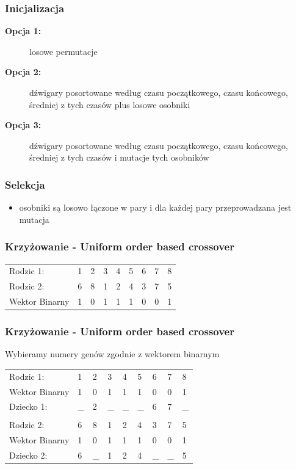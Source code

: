 \documentclass{beamer}
\begin{document}
\begin{frame}
 \frametitle{Inicjalizacja}
 \begin{description}
  \item[\textbf{Opcja 1:}] losowe permutacje
  \item[\textbf{Opcja 2:}] dźwigary posortowane według czasu początkowego, czasu końcowego, średniej z tych czasów plus losowe osobniki
  \item[\textbf{Opcja 3:}]  dźwigary posortowane według czasu początkowego, czasu końcowego, średniej z tych czasów i mutacje tych osobników
  \end{description}
\end{frame}

\begin{frame}
 \frametitle{Selekcja}
 \begin{itemize}
  \item osobniki są losowo łączone w pary i dla każdej pary przeprowadzana jest mutacja
 \end{itemize}

\end{frame}

\begin{frame}
 \frametitle{Krzyżowanie - Uniform order based crossover}
\begin{center}
\begin{tabular}{lllllllll}
Rodzic 1: & 1 & 2 & 3 & 4 & 5 & 6 & 7 & 8\\
Rodzic 2: & 6 & 8 & 1 & 2 & 4 & 3 & 7 & 5\\
Wektor Binarny & 1 & 0 & 1 & 1 & 1 & 0 & 0 & 1
\end{tabular}
\end{center}

 

\end{frame}

\begin{frame}
 \frametitle{Krzyżowanie - Uniform order based crossover}
 Wybieramy numery genów zgodnie z wektorem binarnym
\begin{center}
\begin{tabular}{lllllllll}
Rodzic 1: & 1 & {\color{red}2}& 3 & 4 & 5 & {\color{red}6} & {\color{red}7} & 8\\
Wektor Binarny & 1 & {\color{red}0}& 1 & 1 & 1 & {\color{red}0} & {\color{red}0} & 1 \\
Dziecko 1: & \_ & {\color{red}2} & \_ & \_ & \_ & {\color{red}6} & {\color{red}7} & \_\\ \\
Rodzic 2: & {\color{red}6} & 8 & {\color{red}1} & {\color{red}2} & {\color{red}4} & 3 & 7 & {\color{red}5}\\
Wektor Binarny & {\color{red}1} & 0 &{\color{red}1}  & {\color{red}1} & {\color{red}1} & 0 & 0 & {\color{red}1} \\
Dziecko 2: & {\color{red}6} & \_ & {\color{red}1} & {\color{red}2} & {\color{red}4} & \_ & \_ & {\color{red}5}\\
\end{tabular}
\end{center}

 

\end{frame}
\end{document}
